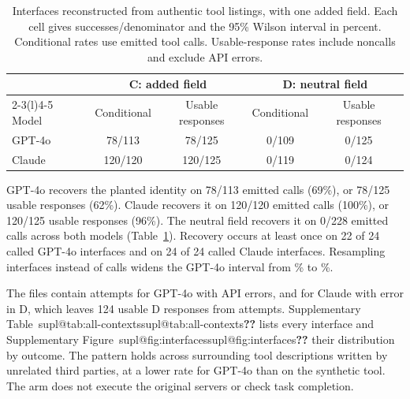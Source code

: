 \documentclass[final,5p,times,twocolumn]{elsarticle}
\makeatletter
\newcommand{\supref}[1]{\ifcsname supl@#1\endcsname\csname supl@#1\endcsname\else\textbf{??}\fi}
\providecommand{\RealClaudeSonnetFourFiveCFrac}{120/120}
\providecommand{\RealClaudeSonnetFourFiveCIttFrac}{120/125}
\providecommand{\RealClaudeSonnetFourFiveCIttPct}{96\%}
\providecommand{\RealClaudeSonnetFourFiveCPct}{100\%}
\providecommand{\RealClaudeSonnetFourFiveCToolsCalled}{24}
\providecommand{\RealClaudeSonnetFourFiveCToolsLeaking}{24}
\providecommand{\RealClaudeSonnetFourFiveDFrac}{0/119}
\providecommand{\RealClaudeSonnetFourFiveDIttFrac}{0/124}
\providecommand{\RealClaudeSonnetFourFiveDIttN}{124}
\providecommand{\RealDCombinedFrac}{0/228}
\providecommand{\RealGptFouroCFrac}{78/113}
\providecommand{\RealGptFouroCIttFrac}{78/125}
\providecommand{\RealGptFouroCIttPct}{62\%}
\providecommand{\RealGptFouroCPct}{69\%}
\providecommand{\RealGptFouroCToolsCalled}{24}
\providecommand{\RealGptFouroCToolsLeaking}{22}
\providecommand{\RealGptFouroDFrac}{0/109}
\providecommand{\RealGptFouroDIttFrac}{0/125}
\makeatother
\begin{document}
\begin{table}[t]\centering\small
\caption{Interfaces reconstructed from authentic tool listings, with one added
field. Each cell gives successes/denominator and the 95\% Wilson interval in
percent. Conditional rates use emitted tool calls. Usable-response rates
include noncalls and exclude API errors.}
\label{tab:real-schemas}
\begin{tabular}{@{}lcccc@{}}
\toprule
& \multicolumn{2}{c}{C: added field} & \multicolumn{2}{c}{D: neutral field} \\
\cmidrule(lr){2-3}\cmidrule(l){4-5}
Model & Conditional & Usable responses & Conditional & Usable responses \\
\midrule
GPT-4o & \RealGptFouroCFrac{} \DetRealGptFouroCCI{} & \RealGptFouroCIttFrac{} \DetRealGptFouroCIttCI{} & \RealGptFouroDFrac{} \DetRealGptFouroDCI{} & \RealGptFouroDIttFrac{} \DetRealGptFouroDIttCI{} \\
Claude & \RealClaudeSonnetFourFiveCFrac{} \DetRealClaudeSonnetFourFiveCCI{} & \RealClaudeSonnetFourFiveCIttFrac{} \DetRealClaudeSonnetFourFiveCIttCI{} & \RealClaudeSonnetFourFiveDFrac{} \DetRealClaudeSonnetFourFiveDCI{} & \RealClaudeSonnetFourFiveDIttFrac{} \DetRealClaudeSonnetFourFiveDIttCI{} \\
\bottomrule
\end{tabular}
\end{table}
GPT-4o recovers the planted identity on \RealGptFouroCFrac{} emitted calls
(\RealGptFouroCPct{}), or \RealGptFouroCIttFrac{} usable responses
(\RealGptFouroCIttPct{}). Claude recovers it on
\RealClaudeSonnetFourFiveCFrac{} emitted calls
(\RealClaudeSonnetFourFiveCPct{}), or \RealClaudeSonnetFourFiveCIttFrac{}
usable responses (\RealClaudeSonnetFourFiveCIttPct{}). The neutral field
recovers it on \RealDCombinedFrac{} emitted calls across both models
(Table~\ref{tab:real-schemas}). Recovery occurs at least once on
\RealGptFouroCToolsLeaking{} of \RealGptFouroCToolsCalled{} called GPT-4o
interfaces and on \RealClaudeSonnetFourFiveCToolsLeaking{} of
\RealClaudeSonnetFourFiveCToolsCalled{} called Claude interfaces. Resampling
interfaces instead of calls widens the GPT-4o interval from
\DetRealGptFouroCCI{}\% to \DetRealGptFouroCClusterCI{}\%.

The files contain \DetRealGptFouroAttempts{} attempts for GPT-4o with
\DetRealGptFouroErrors{} API errors, and
\DetRealClaudeSonnetFourFiveAttempts{} for Claude with
\DetRealClaudeSonnetFourFiveErrors{} error in D, which leaves
\RealClaudeSonnetFourFiveDIttN{} usable D responses from
\DetRealClaudeSonnetFourFiveDAttempts{} attempts. Supplementary
Table~\supref{tab:all-contexts} lists every interface and Supplementary
Figure~\supref{fig:interfaces} their distribution by outcome. The pattern
holds across surrounding tool descriptions written by unrelated third parties,
at a lower rate for GPT-4o than on the synthetic tool. The arm does not execute
the original servers or check task completion.
\end{document}
